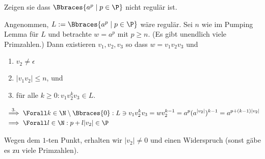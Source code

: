
\begin{exercise}

Zeigen sie dass $\Bbraces{a^p \mid p \in \P}$ nicht regulär ist.

\end{exercise}


\begin{solution}

Angenommen, $L := \Bbraces{a^p \mid p \in \P}$ wäre regulär.
Sei $n$ wie im Pumping Lemma für $L$ und betrachte $w = a^p$ mit $p \geq n$.
(Es gibt unendlich viele Primzahlen.)
Dann existieren $v_1, v_2, v_3$ so dass $w = v_1 v_2 v_3$ und

\begin{enumerate}
    \item $v_2 \neq \epsilon$
    \item $|v_1 v_2| \leq n$, und
    \item für alle $k \geq 0: v_1 v_2^k v_3 \in L$.
\end{enumerate}

\begin{align*}
    & \stackrel{3.}{\implies}
    \Forall k \in \N \setminus \Bbraces{0}:
        L \ni v_1 v_2 ^k v_3 = w v_2^{k-1} = a^p (a^{|v_2|})^{k-1} = a^{p + (k-1) |v_2|} \\
    & \implies
    \Forall l \in \N:
        p + l |v_2| \in \P
\end{align*}

Wegen dem $1$-ten Punkt, erhalten wir $|v_2| \neq 0$ und einen Widerspruch (sonst gäbe es zu viele Primzahlen).

\end{solution}

